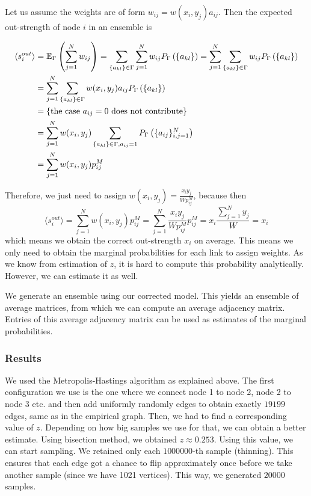 Let us assume the weights are of form $w_{ij} = w(x_i, y_j)a_{ij}$. Then the expected out-strength of node $i$ in an ensemble is

\begin{align}
    \langle s_i^{out} \rangle &= \mathbb{E}_\Gamma\left(\sum_{j=1}^{N} w_{ij}\right) = \sum_{\{a_{kl}\} \in \Gamma} \sum_{j=1}^{N} w_{ij} P_\Gamma\left(\{a_{kl}\}\right) = \sum_{j=1}^{N} \sum_{\{a_{kl}\} \in \Gamma} w_{ij} P_\Gamma\left(\{a_{kl}\}\right) \\ &= \sum_{j=1}^{N} \sum_{\{a_{kl}\} \in \Gamma} w(x_i, y_j)a_{ij} P_\Gamma\left(\{a_{kl}\}\right) \\ &= \text{\{the case $a_{ij} = 0$ does not contribute\}} \notag \\
    &= \sum_{j=1}^{N} w(x_i, y_j) \sum_{\{a_{kl}\} \in \Gamma, a_{ij} = 1} P_\Gamma\left(\{a_{ij}\}_{i,j=1}^N\right) \\
    &= \sum_{j=1}^{N} w(x_i, y_j) p_{ij}^M
\end{align}

Therefore, we just need to assign $w(x_i, y_j) = \frac{x_i y_j}{W p_{ij}^M}$, because then
\begin{equation}
    \langle s_i^{out} \rangle = \sum_{j=1}^{N} w(x_i, y_j) p_{ij}^M = \sum_{j=1}^{N} \frac{x_i y_j}{W p_{ij}^M} p_{ij}^M = x_i \frac{\sum_{j=1}^{N} y_j}{W} = x_i
\end{equation}
which means we obtain the correct out-strength $x_i$ on average. This means we only need to obtain the marginal probabilities for each link to assign weights. As we know from estimation of $z$, it is hard to compute this probability analytically. However, we can estimate it as well. 

We generate an ensemble using our corrected model. This yields an ensemble of average matrices, from which we can compute an average adjacency matrix. Entries of this average adjacency matrix can be used as estimates of the marginal probabilities.

\subsubsection{Results}
We used the Metropolis-Hastings algorithm as explained above. The first configuration we use is the one where we connect node 1 to node 2, node 2 to node 3 etc. and then add uniformly randomly edges to obtain exactly $19\mathpunct{}199$ edges, same as in the empirical graph. Then, we had to find a corresponding value of $z$. Depending on how big samples we use for that, we can obtain a better estimate. Using bisection method, we obtained $z\approx 0.253$. Using this value, we can start sampling. We retained only each $1\mathpunct{}000\mathpunct{}000$-th sample (thinning). This ensures that each edge got a chance to flip approximately once before we take another sample (since we have 1021 vertices). This way, we generated $20\mathpunct{}000$ samples.

